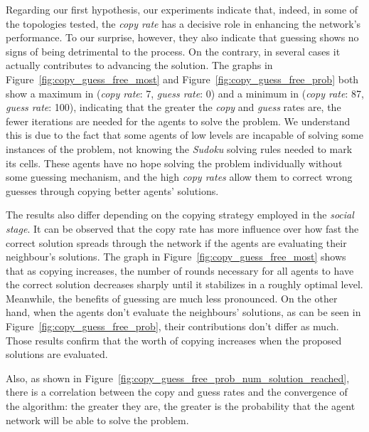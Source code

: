 \documentclass{article}
\begin{document}
Regarding our first hypothesis, our experiments indicate that, indeed, in some of the topologies tested, the {\em copy rate} has a decisive role in enhancing the network's performance. To our surprise, however, they also indicate that guessing shows no signs of being detrimental to the process. On the contrary, in several cases it actually contributes to advancing the solution. The graphs in Figure~\ref{fig:copy_guess_free_most} and Figure~\ref{fig:copy_guess_free_prob} both show a maximum in ({\em copy rate}: 7, {\em guess rate}: 0) and a minimum in ({\em copy rate}: 87, {\em guess rate}: 100), indicating that the greater the {\em copy} and {\em guess} rates are, the fewer iterations are needed for the agents to solve the problem. We understand this is due to the fact that some agents of low levels are incapable of solving some instances of the problem, not knowing the {\em Sudoku} solving rules needed to mark its cells. These agents have no hope solving the problem individually without some guessing mechanism, and the high {\em copy rates} allow them to correct wrong guesses through copying better agents' solutions.

The results also differ depending on the copying strategy employed in the \emph{social stage}. It can be observed that the copy rate has more influence over how fast the correct solution spreads through the network if the agents are evaluating their neighbour's solutions. The graph in Figure~\ref{fig:copy_guess_free_most} shows that as copying increases, the number of rounds necessary for all agents to have the correct solution decreases sharply until it stabilizes in a roughly optimal level. Meanwhile, the benefits of guessing are much less pronounced. On the other hand, when the agents don't evaluate the neighbours' solutions, as can be seen in Figure~\ref{fig:copy_guess_free_prob}, their contributions don't differ as much. Those results confirm that the worth of copying increases when the proposed solutions are evaluated.

Also, as shown in Figure~\ref{fig:copy_guess_free_prob_num_solution_reached}, there is a correlation between the copy and guess rates and the convergence of the algorithm: the greater they are, the greater is the probability that the agent network will be able to solve the problem.
\end{document}

